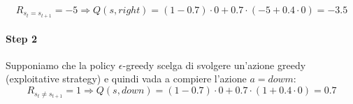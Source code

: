 \documentclass[\main/main.tex]{subfiles}
\begin{document}
\[
  R_{s_t=s_{t+1}} = -5 \Rightarrow Q(s,right) = (1-0.7)\cdot 0 + 0.7\cdot(-5+0.4\cdot0) = -3.5
\]
\paragraph*{Step 2} Supponiamo che la policy $\epsilon$-greedy scelga di svolgere un'azione greedy (exploitative strategy) e quindi vada a compiere l'azione $a=dowm$:
\[
  R_{s_t\neq s_{t+1}} = 1 \Rightarrow Q(s,down) = (1-0.7)\cdot 0 + 0.7\cdot(1+0.4\cdot0) = 0.7
\]
\end{document}
